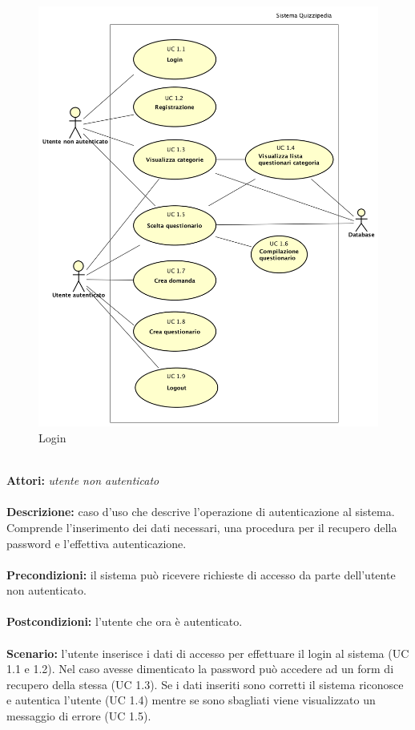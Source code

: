 \documentclass[a4paper,11pt]{article}
\begin{document}
\begin{figure}[h!]
\centering
\includegraphics[scale=0.6]{../immagini/UC1.png}
\caption{Login}
\end{figure}
\ \\
\textbf{Attori:} \textit{utente non autenticato}
\\ \\
\textbf{Descrizione:} caso d'uso che descrive l'operazione di autenticazione al sistema. Comprende l'inserimento dei dati necessari, una procedura per il recupero della password e l'effettiva autenticazione.\\
\\
\textbf{Precondizioni:} il sistema può ricevere richieste di accesso da parte dell’utente non autenticato.\\
\\
\textbf{Postcondizioni:} l’utente che ora è autenticato.\\
\\
\textbf{Scenario:} l’utente inserisce i dati di accesso per effettuare il login al sistema (UC 1.1 e 1.2). Nel caso avesse dimenticato la password può accedere ad un form di recupero della stessa (UC 1.3). Se i dati inseriti sono corretti il sistema riconosce e autentica l'utente (UC 1.4) mentre se sono sbagliati viene visualizzato un messaggio di errore (UC 1.5).\\
\end{document}

